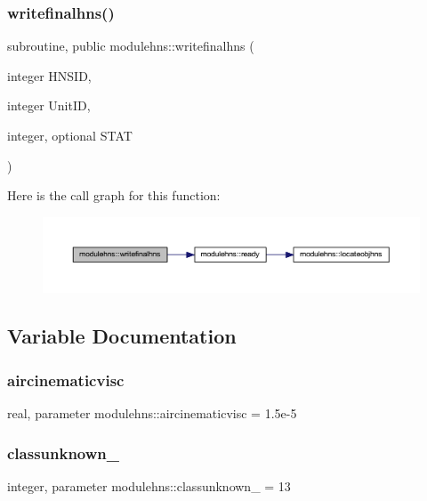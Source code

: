 \subsubsection{\texorpdfstring{writefinalhns()}{writefinalhns()}}
{\footnotesize\ttfamily subroutine, public modulehns\+::writefinalhns (\begin{DoxyParamCaption}\item[{integer}]{H\+N\+S\+ID,  }\item[{integer}]{Unit\+ID,  }\item[{integer, optional}]{S\+T\+AT }\end{DoxyParamCaption})}

Here is the call graph for this function\+:\nopagebreak
\begin{figure}[H]
\begin{center}
\leavevmode
\includegraphics[width=350pt]{namespacemodulehns_abf878e74b0b3dfd62305bbe1afe7b434_cgraph}
\end{center}
\end{figure}


\subsection{Variable Documentation}
\mbox{\label{namespacemodulehns_aaa60d48f4a69de776e4d6d3c202a822a}} 
\subsubsection{\texorpdfstring{aircinematicvisc}{aircinematicvisc}}
{\footnotesize\ttfamily real, parameter modulehns\+::aircinematicvisc = 1.\+5e-\/5\hspace{0.3cm}{\ttfamily [private]}}

\mbox{\label{namespacemodulehns_a358b7b669ccd8504299b7c44c39cad28}} 
\subsubsection{\texorpdfstring{classunknown\+\_\+}{classunknown\_}}
{\footnotesize\ttfamily integer, parameter modulehns\+::classunknown\+\_\+ = 13\hspace{0.3cm}{\ttfamily [private]}}

